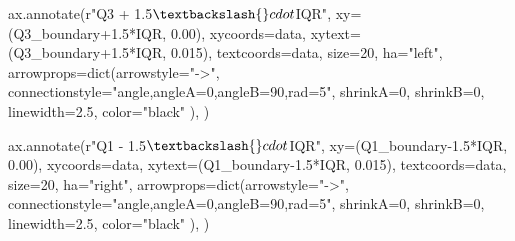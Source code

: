 \documentclass[
  letterpaper,
  DIV=11,
  numbers=noendperiod,
  oneside]{scrreprt}
\newenvironment{Shaded}{\begin{snugshade}}{\end{snugshade}}
\newcommand{\BuiltInTok}[1]{\textcolor[rgb]{0.00,0.23,0.31}{#1}}
\newcommand{\DecValTok}[1]{\textcolor[rgb]{0.68,0.00,0.00}{#1}}
\newcommand{\FloatTok}[1]{\textcolor[rgb]{0.68,0.00,0.00}{#1}}
\newcommand{\NormalTok}[1]{\textcolor[rgb]{0.00,0.23,0.31}{#1}}
\newcommand{\OperatorTok}[1]{\textcolor[rgb]{0.37,0.37,0.37}{#1}}
\newcommand{\StringTok}[1]{\textcolor[rgb]{0.13,0.47,0.30}{#1}}
\newcommand{\VerbatimStringTok}[1]{\textcolor[rgb]{0.13,0.47,0.30}{#1}}
\begin{document}
\begin{Shaded}
\begin{Highlighting}[]
\NormalTok{ax.annotate(}\VerbatimStringTok{r"Q3 + 1.5$\textbackslash{}cdot$IQR"}\NormalTok{,}
\NormalTok{            xy}\OperatorTok{=}\NormalTok{(Q3\_boundary}\OperatorTok{+}\FloatTok{1.5}\OperatorTok{*}\NormalTok{IQR, }\FloatTok{0.00}\NormalTok{), xycoords}\OperatorTok{=}\StringTok{\textquotesingle{}data\textquotesingle{}}\NormalTok{,}
\NormalTok{            xytext}\OperatorTok{=}\NormalTok{(Q3\_boundary}\OperatorTok{+}\FloatTok{1.5}\OperatorTok{*}\NormalTok{IQR, }\FloatTok{0.015}\NormalTok{), textcoords}\OperatorTok{=}\StringTok{\textquotesingle{}data\textquotesingle{}}\NormalTok{,}
\NormalTok{            size}\OperatorTok{=}\DecValTok{20}\NormalTok{,}
\NormalTok{            ha}\OperatorTok{=}\StringTok{"left"}\NormalTok{,}
\NormalTok{            arrowprops}\OperatorTok{=}\BuiltInTok{dict}\NormalTok{(arrowstyle}\OperatorTok{=}\StringTok{"{-}\textgreater{}"}\NormalTok{,}
\NormalTok{                            connectionstyle}\OperatorTok{=}\StringTok{"angle,angleA=0,angleB=90,rad=5"}\NormalTok{,}
\NormalTok{                            shrinkA}\OperatorTok{=}\DecValTok{0}\NormalTok{, shrinkB}\OperatorTok{=}\DecValTok{0}\NormalTok{,}
\NormalTok{                            linewidth}\OperatorTok{=}\FloatTok{2.5}\NormalTok{,}
\NormalTok{                            color}\OperatorTok{=}\StringTok{"black"}
\NormalTok{                            ),}
\NormalTok{            )}

\NormalTok{ax.annotate(}\VerbatimStringTok{r"Q1 {-} 1.5$\textbackslash{}cdot$IQR"}\NormalTok{,}
\NormalTok{            xy}\OperatorTok{=}\NormalTok{(Q1\_boundary}\OperatorTok{{-}}\FloatTok{1.5}\OperatorTok{*}\NormalTok{IQR, }\FloatTok{0.00}\NormalTok{), xycoords}\OperatorTok{=}\StringTok{\textquotesingle{}data\textquotesingle{}}\NormalTok{,}
\NormalTok{            xytext}\OperatorTok{=}\NormalTok{(Q1\_boundary}\OperatorTok{{-}}\FloatTok{1.5}\OperatorTok{*}\NormalTok{IQR, }\FloatTok{0.015}\NormalTok{), textcoords}\OperatorTok{=}\StringTok{\textquotesingle{}data\textquotesingle{}}\NormalTok{,}
\NormalTok{            size}\OperatorTok{=}\DecValTok{20}\NormalTok{,}
\NormalTok{            ha}\OperatorTok{=}\StringTok{"right"}\NormalTok{,}
\NormalTok{            arrowprops}\OperatorTok{=}\BuiltInTok{dict}\NormalTok{(arrowstyle}\OperatorTok{=}\StringTok{"{-}\textgreater{}"}\NormalTok{,}
\NormalTok{                            connectionstyle}\OperatorTok{=}\StringTok{"angle,angleA=0,angleB=90,rad=5"}\NormalTok{,}
\NormalTok{                            shrinkA}\OperatorTok{=}\DecValTok{0}\NormalTok{, shrinkB}\OperatorTok{=}\DecValTok{0}\NormalTok{,}
\NormalTok{                            linewidth}\OperatorTok{=}\FloatTok{2.5}\NormalTok{,}
\NormalTok{                            color}\OperatorTok{=}\StringTok{"black"}
\NormalTok{                            ),}
\NormalTok{            )}


\end{Highlighting}
\end{Shaded}
\end{document}
